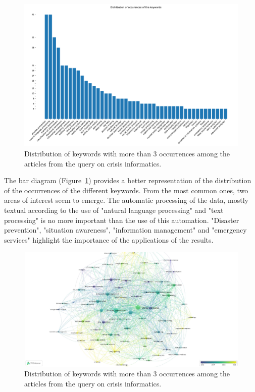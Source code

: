 \begin{figure}[bp]
    \centering
    \includegraphics[width=\textwidth]{figures/chap-2/crisis-informatic-bar.pdf}
    \caption{Distribution of keywords with more than 3 occurrences among the articles from the query on crisis informatics. }
    \label{literature:crisis-informatic-bar}
\end{figure}

The bar diagram (Figure~\ref{literature:crisis-informatic-bar}) provides a better representation of the distribution of the occurrences of the different keywords.
From the most common ones, two areas of interest seem to emerge.
The automatic processing of the data, mostly textual according to the use of "natural language processing" and "text processing" is no more important than the use of this automation.
"Disaster prevention", "situation awareness", "information management" and "emergency services" highlight the importance of the applications of the results.

\begin{figure}[bp]
    \includegraphics[width=\paperwidth,height=\paperheight,keepaspectratio, angle=90]{figures/chap-2/crisis-informatic-overlay.pdf}
    \caption{Distribution of keywords with more than 3 occurrences among the articles from the query on crisis informatics. }
    \label{literature:crisis-informatic-overlay}
\end{figure}

